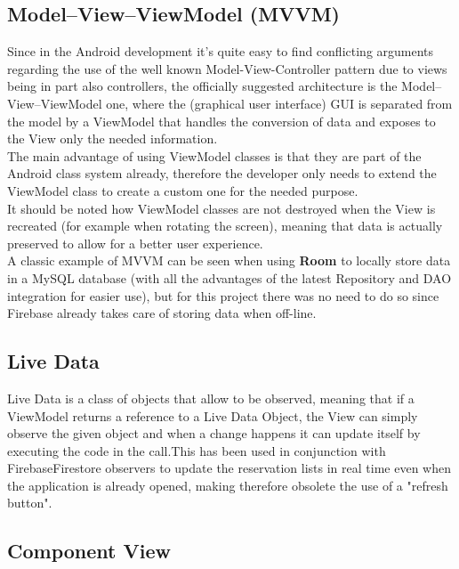 \subsection{Model–View–ViewModel (MVVM)}
Since in the Android development it's quite easy to find conflicting arguments regarding the use of the well known Model-View-Controller pattern due to views being in part also controllers, the officially suggested architecture is the Model–View–ViewModel one, where the (graphical user interface) GUI is separated from the model by a ViewModel that handles the conversion of data and exposes to the View only the needed information.\\
The main advantage of using ViewModel classes is that they are part of the Android class system already, therefore the developer only needs to extend the ViewModel class to create a custom one for the needed purpose.\\
It should be noted how ViewModel classes are not destroyed when the View is recreated (for example when rotating the screen), meaning that data is actually preserved to allow for a better user experience.\\
A classic example of MVVM can be seen when using \textbf{Room} to locally store data in a MySQL database (with all the advantages of the latest Repository and DAO integration for easier use), but for this project there was no need to do so since Firebase already takes care of storing data when off-line.
\clearpage
\subsection{Live Data}\vspace{-0.1cm}
Live Data is a class of objects that allow to be observed, meaning that if a ViewModel returns a reference to a Live Data Object, the View can simply observe the given object and when a change happens it can update itself by executing the code in the call.This has been used in conjunction with FirebaseFirestore observers to update the reservation lists in real time even when the application is already opened, making therefore obsolete the use of a "refresh button".
\subsection{Component View}
